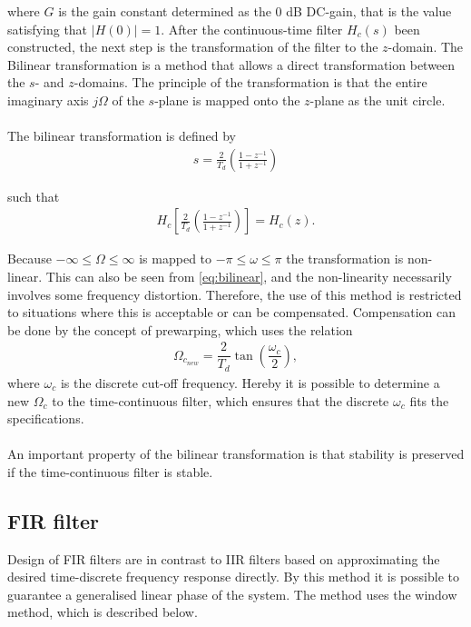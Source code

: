 where $G$ is the gain constant determined as the 0 dB DC-gain, that is the value satisfying that $|H(0)| = 1$. After the continuous-time filter $H_c(s)$ been constructed, the next step is the transformation of the filter to the $z$-domain. The Bilinear transformation is a method that allows a direct transformation between the $s$- and $z$-domains. The principle of the transformation is that the entire imaginary axis $j\Omega$ of the $s$-plane is mapped onto the $z$-plane as the unit circle.
\\\\
The bilinear transformation is defined by 
\begin{align*}
s=\frac{2}{T_d}\left(\frac{1-z^{-1}}{1+z^{-1}}\right)
\end{align*}

such that 
\begin{align} \label{eq:bilinear}
H_c\left[\frac{2}{T_d}\left(\frac{1-z^{-1}}{1+z^{-1}}\right)\right]=H_c(z). 
\end{align}

Because $-\infty \leq \Omega \leq \infty $ is mapped to $-\pi \leq \omega \leq \pi$ the transformation is non-linear. This can also be seen from \eqref{eq:bilinear}, and the non-linearity necessarily involves some frequency distortion. Therefore, the use of this method is restricted to situations where this is acceptable or can be compensated. Compensation can be done by the concept of prewarping, which uses the relation
\begin{align*}
\Omega_{c_{new}} = \dfrac{2}{T_d} \tan \left( \dfrac{\omega_c}{2} \right),
\end{align*}
where $\omega_c$ is the discrete cut-off frequency. Hereby it is possible to determine a new $\Omega_c$ to the time-continuous filter, which ensures that the discrete $\omega_c$ fits the specifications. \\\\
An important property of the bilinear transformation is that stability is preserved if the time-continuous filter is stable.

\subsection{FIR filter} \label{subsec:FIR}
Design of FIR filters are in contrast to IIR filters based on approximating the desired time-discrete frequency response directly. By this method it is possible to guarantee a generalised linear phase of the system. The method uses the window method, which is described below.

